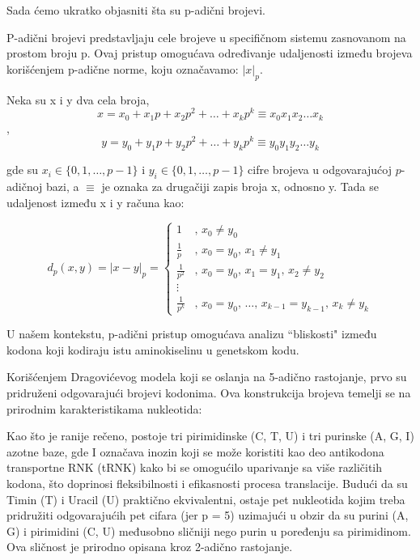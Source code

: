 \documentclass[a4paper,12pt]{article}
\begin{document}
\bigskip
Sada ćemo ukratko objasniti šta su p-adični brojevi.

\smallskip
P-adični brojevi predstavljaju cele brojeve u specifičnom sistemu zasnovanom na prostom broju p. Ovaj pristup omogućava određivanje udaljenosti između brojeva korišćenjem p-adične norme, koju označavamo: \(\lvert x \rvert_{p}\).

Neka su x i y dva cela broja, 
\[ 
x = x_{0} + x_{1}p + x_{2}p^{2} + \ldots + x_{k}p^{k} \equiv x_{0}x_{1}x_{2}\ldots x_{k}
\],
\[ y = y_{0} + y_{1}p + y_{2}p^{2} + \ldots + y_{k}p^{k} \equiv y_{0}y_{1}y_{2}\ldots y_{k}
\]

\bigskip
gde su \( x_i \in \{0, 1, \ldots, p-1\} \) i \( y_i \in \{0, 1, \ldots, p-1\} \) cifre brojeva u odgovarajućoj \( p \)-adičnoj bazi, a \( \equiv \) je oznaka za drugačiji zapis broja x, odnosno y. Tada se udaljenost između x i y računa kao:

\[
d_{p}(x, y) = |x - y|_{p} = \begin{cases}
    1 & \text{, } x_{0} \neq y_{0} \\
    \frac{1}{p} & \text{, } x_{0} = y_{0} \text{, } x_{1} \neq y_{1} \\
    \frac{1}{p^2} & \text{, } x_{0} = y_{0} \text{, } x_{1} = y_{1} \text{, } x_{2} \neq y_{2} \\
    \vdots & \\
    \frac{1}{p^k} & \text{, } x_{0} = y_{0} \text{, } \ldots \text{, } x_{k-1} = y_{k-1} \text{, } x_{k} \neq y_{k}
\end{cases}
\]

\bigskip
U našem kontekstu, p-adični pristup omogućava analizu “bliskosti" između kodona koji kodiraju istu aminokiselinu u genetskom kodu. 

\medskip
Korišćenjem Dragovićevog modela koji se oslanja na 5-adično rastojanje, prvo su pridruženi odgovarajući brojevi kodonima. Ova konstrukcija brojeva temelji se na prirodnim karakteristikama nukleotida:

Kao što je ranije rečeno, postoje tri pirimidinske (C, T, U) i tri purinske (A, G, I) azotne baze, gde I označava inozin koji se može koristiti kao deo antikodona transportne RNK (tRNK) kako bi se omogućilo uparivanje sa više različitih kodona, što doprinosi fleksibilnosti i efikasnosti procesa translacije. Budući da su Timin (T) i Uracil (U) praktično ekvivalentni, ostaje pet nukleotida kojim treba pridružiti odgovarajućih pet cifara (jer p = 5) uzimajući u obzir da su purini (A, G) i pirimidini (C, U) međusobno sličniji nego purin u poređenju sa pirimidinom. Ova sličnost je prirodno opisana kroz 2-adično rastojanje. 
\end{document}
